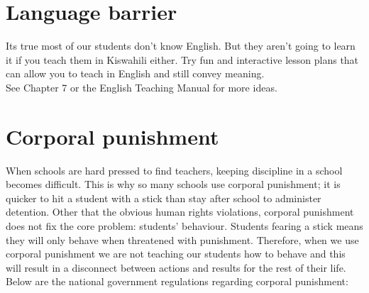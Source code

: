 \section{Language barrier}

Its true most of our students don't know English.  But they aren't going to learn it if you teach them in Kiswahili either.  Try fun and interactive lesson plans that can allow you to teach in English and still convey meaning.\\

See Chapter 7 or the English Teaching Manual for more ideas.

\section{Corporal punishment}
When schools are  hard pressed to find teachers, keeping discipline in a school becomes difficult.  This is why so many schools use corporal punishment; it is quicker to hit a student with a stick than stay after school to administer detention.  Other that the obvious human rights violations, corporal punishment does not fix the core problem: students' behaviour. Students fearing a stick means they will only behave when threatened with punishment.  Therefore, when we use corporal punishment we are not teaching our students how to behave and this will result in a disconnect between actions and results for the rest of their life.  Below are the national government regulations regarding corporal punishment:
